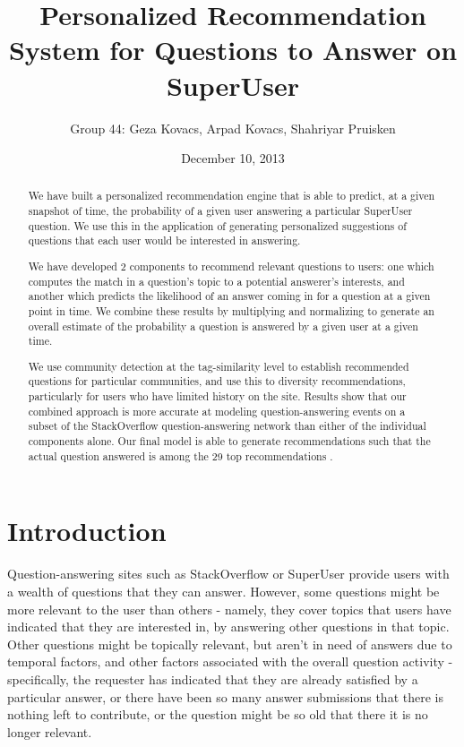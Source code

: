 \documentclass[a4paper]{article}
\title{Personalized Recommendation System for Questions to Answer on SuperUser}
\author{Group 44: Geza Kovacs, Arpad Kovacs, Shahriyar Pruisken}
\date{December 10, 2013}
\begin{document}
\maketitle

\begin{abstract}
We have built a personalized recommendation engine that is able to predict, at a given snapshot of time, the probability of a given user answering a particular SuperUser question. We use this in the application of generating personalized suggestions of questions that each user would be interested in answering.

We have developed 2 components to recommend relevant questions to users: one which computes the match in a question's topic to a potential answerer's interests, and another which predicts the likelihood of an answer coming in for a question at a given point in time. We combine these results by multiplying and normalizing to generate an overall estimate of the probability a question is answered by a given user at a given time.

We use community detection at the tag-similarity level to establish recommended questions for particular communities, and use this to diversity recommendations, particularly for users who have limited history on the site. Results show that our combined approach is more accurate at modeling question-answering events on a subset of the StackOverflow question-answering network than either of the individual components alone. Our final model is able to generate recommendations such that the actual question answered is among the 29 top recommendations .
\end{abstract}


\section{Introduction}

Question-answering sites such as StackOverflow or SuperUser provide users with a wealth of questions that they can answer. However, some questions might be more relevant to the user than others - namely, they cover topics that users have indicated that they are interested in, by answering other questions in that topic. Other questions might be topically relevant, but aren't in need of answers due to temporal factors, and other factors associated with the overall question activity - specifically, the requester has indicated that they are already satisfied by a particular answer, or there have been so many answer submissions that there is nothing left to contribute, or the question might be so old that there it is no longer relevant.
\end{document}
